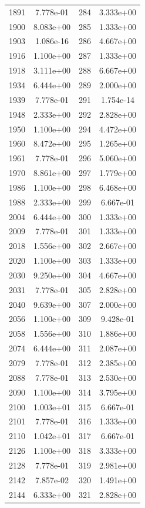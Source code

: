 \documentclass[12pt]{article}
\begin{document}
\begin{longtable}{@{}cccc@{}}
1891 & 7.778e-01 & 284 & 3.333e+00 \\
1900 & 8.083e+00 & 285 & 1.333e+00 \\
1903 & 1.086e-16 & 286 & 4.667e+00 \\
1916 & 1.100e+00 & 287 & 1.333e+00 \\
1918 & 3.111e+00 & 288 & 6.667e+00 \\
1934 & 6.444e+00 & 289 & 2.000e+00 \\
1939 & 7.778e-01 & 291 & 1.754e-14 \\
1948 & 2.333e+00 & 292 & 2.828e+00 \\
1950 & 1.100e+00 & 294 & 4.472e+00 \\
1960 & 8.472e+00 & 295 & 1.265e+00 \\
1961 & 7.778e-01 & 296 & 5.060e+00 \\
1970 & 8.861e+00 & 297 & 1.779e+00 \\
1986 & 1.100e+00 & 298 & 6.468e+00 \\
1988 & 2.333e+00 & 299 & 6.667e-01 \\
2004 & 6.444e+00 & 300 & 1.333e+00 \\
2009 & 7.778e-01 & 301 & 1.333e+00 \\
2018 & 1.556e+00 & 302 & 2.667e+00 \\
2020 & 1.100e+00 & 303 & 1.333e+00 \\
2030 & 9.250e+00 & 304 & 4.667e+00 \\
2031 & 7.778e-01 & 305 & 2.828e+00 \\
2040 & 9.639e+00 & 307 & 2.000e+00 \\
2056 & 1.100e+00 & 309 & 9.428e-01 \\
2058 & 1.556e+00 & 310 & 1.886e+00 \\
2074 & 6.444e+00 & 311 & 2.087e+00 \\
2079 & 7.778e-01 & 312 & 2.385e+00 \\
2088 & 7.778e-01 & 313 & 2.530e+00 \\
2090 & 1.100e+00 & 314 & 3.795e+00 \\
2100 & 1.003e+01 & 315 & 6.667e-01 \\
2101 & 7.778e-01 & 316 & 1.333e+00 \\
2110 & 1.042e+01 & 317 & 6.667e-01 \\
2126 & 1.100e+00 & 318 & 3.333e+00 \\
2128 & 7.778e-01 & 319 & 2.981e+00 \\
2142 & 7.857e-02 & 320 & 1.491e+00 \\
2144 & 6.333e+00 & 321 & 2.828e+00 \\

\end{longtable}
\end{document}
